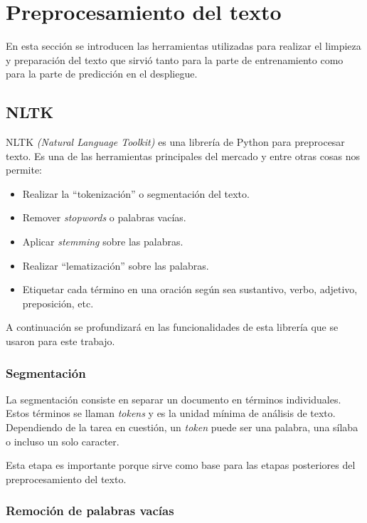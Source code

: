 \section{Preprocesamiento del texto}

En esta sección se introducen las herramientas utilizadas para realizar el limpieza y preparación del texto que sirvió tanto para la parte de entrenamiento como para la parte de predicción en el despliegue.

\subsection{NLTK}

NLTK \textit{(Natural Language Toolkit)} es una librería de Python para preprocesar texto. Es una de las herramientas principales del mercado y entre otras cosas nos permite:
\begin{itemize}
\item Realizar la ``tokenización'' o segmentación del texto.
\item Remover \textit{stopwords} o palabras vacías.
\item Aplicar \textit{stemming} sobre las palabras.
\item Realizar ``lematización'' sobre las palabras.
\item Etiquetar cada término en una oración según sea sustantivo, verbo, adjetivo, preposición, etc.
\end{itemize}

A continuación se profundizará en las funcionalidades de esta librería que se usaron para este trabajo.

\subsubsection{Segmentación}

La segmentación consiste en separar un documento en términos individuales. Estos términos se llaman \textit{tokens} y es la unidad mínima de análisis de texto. Dependiendo de la tarea en cuestión, un \textit{token} puede ser una palabra, una sílaba o incluso un solo caracter.

Esta etapa es importante porque sirve como base para las etapas posteriores del preprocesamiento del texto.

\subsubsection{Remoción de palabras vacías}

